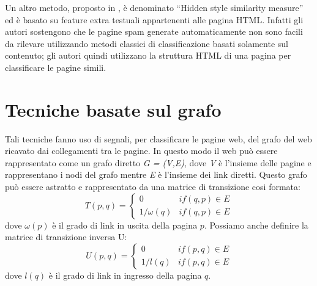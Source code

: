 Un altro metodo, proposto in \cite{DBLP:conf:airweb:UrvoyLF06}, è denominato ``Hidden style similarìty measure'' ed è basato su feature extra testuali appartenenti alle pagina HTML. Infatti gli autori sostengono che le pagine spam generate automaticamente non sono facili da rilevare utilizzando metodi classici di classificazione basati solamente sul contenuto; gli autori quindi utilizzano la struttura HTML di una pagina per classificare le pagine simili.

\section{Tecniche basate sul grafo}
Tali tecniche fanno uso di segnali, per classificare le pagine web, del grafo del web ricavato dai collegamenti tra le pagine. In questo modo il web può essere rappresentato come un grafo diretto \textit{G = (V,E)}, dove \textit{V} è l'insieme delle pagine e rappresentano i nodi del grafo mentre \textit{E} è l'insieme dei link diretti. Questo grafo può essere astratto e rappresentato da una matrice di transizione cosi formata:
\begin{equation}
T(p,q)=\left \{
\begin{array}{cc}
0 & if(q,p) \in E\\
1/\omega(q) & if(q,p) \in E
\end{array}
\right .
\end{equation}
dove \(\omega(p)\) è il grado di link in uscita della pagina \(p\).
Possiamo anche definire la matrice di transizione inversa U:
\begin{equation}
U(p,q)=\left \{
\begin{array}{cc}
0 & if(p,q) \in E\\
1/l(q) & if(p,q) \in E
\end{array}
\right .
\end{equation}
dove \(l(q)\) è il grado di link in ingresso della pagina \(q\).
